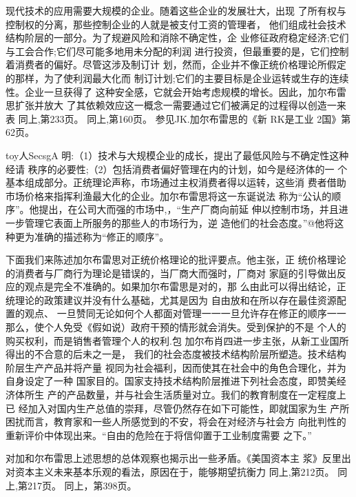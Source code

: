 现代技术的应用需要大规模的企业。随着这些企业的发展壮大，出现
了所有权与控制权的分离，那些控制企业的人就是被支付工资的管理者，
他们组成社会技术结构阶层的一部分。为了规避风险和消除不确定性，企
业修征政府稳定经济;它们与工会合作;它们尽可能多地用未分配的利润
进行投资，但最重要的是，它们控制着消费者的偏好。尽管这涉及制订计
划，然而，企业并不像正统价格理论所假定的那样，为了使利润最大化而
制订计划;它们的主要目标是企业运转或生存的连续性。企业一旦获得了
这种安全感，它就会开始考虑规模的增长。因此，加尔布雷思扩张并放大
了其依赖效应这一概念一需要通过它们被满足的过程得以创造一来表
同上,第233页。
同上,第160页。
参见JK.加尔布雷思的《新
RK是工业
2国》第62页。

toy人SecsgA
明:（1）技术与大规模企业的成长，提出了最低风险与不确定性这种经请
秩序的必要性;（2）包括消费者偏好管理在内的计划，如今是经济体的一
个基本组成部分。正统理论声称，市场通过主权消费者得以运转，这些消
费者借助市场价格来指挥利渔最大化的企业。加尔布雷思将这一东诞说法
称为“公认的顺序”。他提出，在公司大而强的市场中,，“生产厂商向前延
伸以控制市场，并且进一步管理它表面上所服务的那些人的市场行为，逆
造他们的社会态度。”@他将这种更为准确的描述称为“修正的顺序”。

下面我们来陈述加尔布雷思对正统价格理论的批评要点。他主张，正
统价格理论的消费者与厂商行为理论是错误的，当厂商大而强时，厂商对
家庭的引导做出反应的观点是完全不准确的。如果加尔布雷思是对的，那
么由此可以得出结论，正统理论的政策建议并没有什么基础，尤其是因为
自由放和在所以存在最佳资源配置的观点、
一旦赞同无论如何个人都面对管理一一一旦允许存在修正的顺序一一
那么，使个人免受《假如说）政府干预的情形就会消失。受到保护的不是
个人的购买权利，而是销售者管理个人的权利.包
加尔布肖四进一步主张，从新工业国所得出的不合意的后未之一是，
我们的社会态度被技术结构阶层所塑造。技术结构阶层生产产品并将产量
视同为社会福利，因而使其在社会中的角色合理化，并为自身设定了一种
国家目的。国家支持技术结构阶层推进下列社会态度，即赞美经济体所生
产的产品数量，并与社会生活质量对立。我们的教育制度在一定程度上已
经加入对国内生产总值的崇拜，尽管仍然存在如下可能性，即就国家为生
产所困扰而言，教育家和一些人所感觉到的不安，将会在对经济与社会方
向批判性的重新评价中体现出来。“自由的危险在于将信仰置于工业制度需要
之下。”

对加和尔布雷思上述思想的总体观察也揭示出一些矛盾。《美国资本主
浆》反里出对资本主义未来基本乐观的看法，原因在于，能够期望抗衡力
同上,第212页。
同上,第217页。
同上，第398页。

